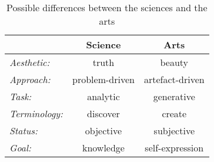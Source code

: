 \documentclass[letterpaper]{article}
\begin{document}
\begin{table}
\begin{center}
 \begin{tabular}{||l c c ||}
 \hline
 & {\bf Science} & {\bf Arts} \\[0.5ex]
 \hline\hline
{\em Aesthetic:} & truth & beauty \\ \hline

{\em Approach:} & problem-driven & artefact-driven \\ \hline

{\em Task:} & analytic & generative \\ \hline

{\em Terminology:} & discover & create \\ \hline

{\em Status:} & objective & subjective \\ \hline

{\em Goal:} & knowledge & self-expression \\ \hline

 \end{tabular} \caption{Possible differences between the sciences and the arts}
\end{center}
\label{Table:differences}
\end{table}
\end{document}
